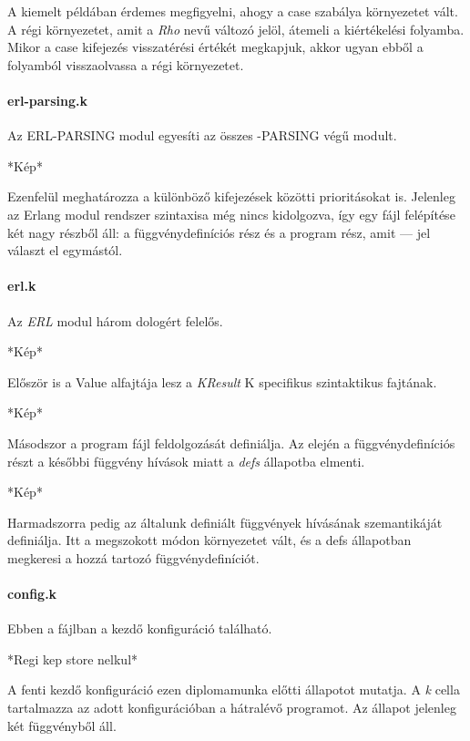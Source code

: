 

A kiemelt példában érdemes megfigyelni, ahogy a case szabálya környezetet vált. A régi környezetet, amit a \textit{Rho} nevű változó jelöl, átemeli a kiértékelési folyamba. Mikor a case kifejezés visszatérési értékét megkapjuk, akkor ugyan ebből a folyamból visszaolvassa a régi környezetet.

\paragraph{erl-parsing.k}

Az ERL-PARSING modul egyesíti az összes -PARSING végű modult.

*Kép*

Ezenfelül meghatározza a különböző kifejezések közötti prioritásokat is. Jelenleg az Erlang modul rendszer szintaxisa még nincs kidolgozva, így egy fájl felépítése két nagy részből áll: a függvénydefiníciós rész és a program rész, amit --- jel választ el egymástól.

\paragraph{erl.k}

Az \textit{ERL} modul három dologért felelős.

*Kép*

Először is a Value alfajtája lesz a \textit{KResult} K specifikus szintaktikus fajtának.

*Kép*

Másodszor a program fájl feldolgozását definiálja. Az elején a függvénydefiníciós részt a későbbi függvény hívások miatt a \textit{defs} állapotba elmenti.

*Kép*

Harmadszorra pedig az általunk definiált függvények hívásának szemantikáját definiálja. Itt a megszokott módon környezetet vált, és a defs állapotban megkeresi a hozzá tartozó függvénydefiníciót.


\paragraph{config.k}

Ebben a fájlban a kezdő konfiguráció található.

*Regi kep store nelkul*

A fenti kezdő konfiguráció ezen diplomamunka előtti állapotot mutatja. A \textit{k} cella tartalmazza az adott konfigurációban a hátralévő programot. Az állapot jelenleg két függvényből áll. 

